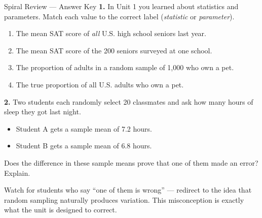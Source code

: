 \documentclass[10pt]{article}
\begin{document}
\namedateperiod

\vspace{0.15in}

\begin{notesbox}{Spiral Review --- Answer Key}
\textbf{1.} In Unit 1 you learned about statistics and parameters. Match each value to
the correct label (\emph{statistic} or \emph{parameter}).

\vspace{0.1in}
\begin{enumerate}[label=\alph*.]
  \item The mean SAT score of \emph{all} U.S. high school seniors last year.
        \hfill {}
  \item The mean SAT score of the 200 seniors surveyed at one school.
        \hfill {}
  \item The proportion of adults in a random sample of 1,000 who own a pet.
        \hfill {}
  \item The true proportion of all U.S. adults who own a pet.
        \hfill {}
\end{enumerate}

\vspace{0.15in}
\textbf{2.} Two students each randomly select 20 classmates and ask how many hours of
sleep they got last night.
\begin{itemize}
  \item Student A gets a sample mean of 7.2 hours.
  \item Student B gets a sample mean of 6.8 hours.
\end{itemize}

Does the difference in these sample means prove that one of them made an error?
Explain. 
\end{notesbox}

\begin{teachernote}
Watch for students who say ``one of them is wrong'' --- redirect to the idea that
random sampling naturally produces variation. This misconception is exactly what the
unit is designed to correct.
\end{teachernote}
\end{document}
